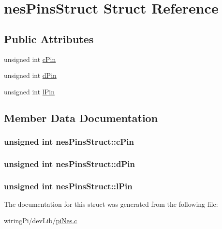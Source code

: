 \hypertarget{structnesPinsStruct}{\section{nes\-Pins\-Struct Struct Reference}
\label{structnesPinsStruct}
}
\subsection*{Public Attributes}
\begin{DoxyCompactItemize}
\item 
unsigned int \hyperlink{structnesPinsStruct_a0dcbcf5c9f17bb59ac27051ad496e72d}{c\-Pin}
\item 
unsigned int \hyperlink{structnesPinsStruct_a9392256befea9921ac89972e88515aed}{d\-Pin}
\item 
unsigned int \hyperlink{structnesPinsStruct_a42f8acf56f88e7ba9d4a9fb2dc808147}{l\-Pin}
\end{DoxyCompactItemize}


\subsection{Member Data Documentation}
\hypertarget{structnesPinsStruct_a0dcbcf5c9f17bb59ac27051ad496e72d}{
\subsubsection[{c\-Pin}]{\setlength{\rightskip}{0pt plus 5cm}unsigned int nes\-Pins\-Struct\-::c\-Pin}}\label{structnesPinsStruct_a0dcbcf5c9f17bb59ac27051ad496e72d}
\hypertarget{structnesPinsStruct_a9392256befea9921ac89972e88515aed}{
\subsubsection[{d\-Pin}]{\setlength{\rightskip}{0pt plus 5cm}unsigned int nes\-Pins\-Struct\-::d\-Pin}}\label{structnesPinsStruct_a9392256befea9921ac89972e88515aed}
\hypertarget{structnesPinsStruct_a42f8acf56f88e7ba9d4a9fb2dc808147}{
\subsubsection[{l\-Pin}]{\setlength{\rightskip}{0pt plus 5cm}unsigned int nes\-Pins\-Struct\-::l\-Pin}}\label{structnesPinsStruct_a42f8acf56f88e7ba9d4a9fb2dc808147}


The documentation for this struct was generated from the following file\-:\begin{DoxyCompactItemize}
\item 
wiring\-Pi/dev\-Lib/\hyperlink{piNes_8c}{pi\-Nes.\-c}\end{DoxyCompactItemize}

